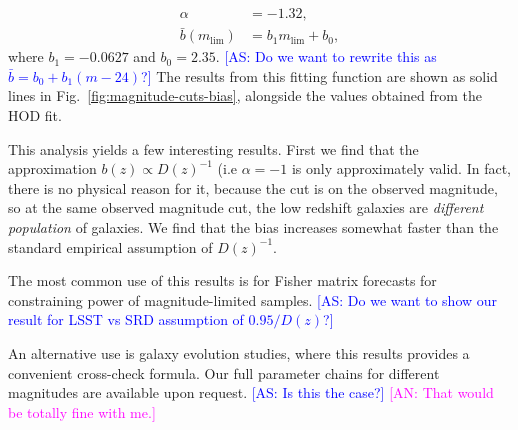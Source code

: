 \documentclass[a4paper,11pt]{article}
\newcommand{\as}[1]{{\textcolor{blue}{[AS: #1]}}}
\newcommand{\an}[1]{{\textcolor{magenta}{[AN: #1]}}}
\begin{document}
\begin{equation}
\begin{aligned}
\alpha &= -1.32, \\
\bar{b}(m_{\mathrm{lim}}) &= b_{1}m_{\mathrm{lim}} + b_{0},
\label{eq:bias-fit-func-result}
\end{aligned}  
\end{equation}
where $b_{1} = -0.0627$ and $b_{0} = 2.35$. \as{Do we want to rewrite this as $\bar{b} = b_0 + b_1 (m-24)$?} The results from this fitting function are shown as solid lines in Fig.~\ref{fig:magnitude-cuts-bias}, alongside the values obtained from the HOD fit.

This analysis yields a few interesting results. First we find that the approximation $b(z)\propto D(z)^{-1}$ (i.e $\alpha=-1$ is only approximately valid. In fact, there is no physical reason for it, because the cut is on the observed magnitude, so at the same observed magnitude cut, the low redshift galaxies are \emph{different population} of galaxies. We find that the bias increases somewhat faster than the standard empirical assumption of $D(z)^{-1}$. 

The most common use of this results is for Fisher matrix forecasts for constraining power of magnitude-limited samples. \as{Do we want to show our result for LSST vs SRD assumption of $0.95/D(z)$?}

An alternative use is galaxy evolution studies, where this results provides a convenient cross-check formula. Our full parameter chains for different magnitudes are available upon request. \as{Is this the case?} \an{That would be totally fine with me.}
  
\end{document}
